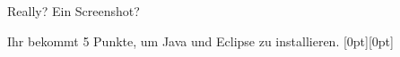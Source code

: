 \begin{frame}[fragile]{Really? Ein Screenshot?}
    \begin{exercise}
    Ihr bekommt 5 Punkte, um Java und Eclipse zu installieren. \raisebox{-2pt}[0pt][0pt]{}
    \end{exercise}
    \begin{solve}
    \end{solve}
\end{frame}